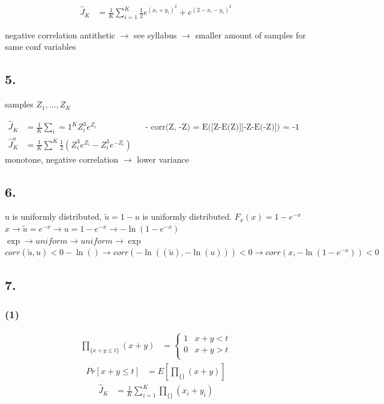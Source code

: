 \begin{align*}
\widehat{J}_{K}&=\frac{1}{K}\sum _{{i=1}}^{K}\frac{1}{2}e^{\left(x_{i}+y_{i}\right)^{2}}+e^{\left(2-x_{i}-y_{i}\right)^{2}}
\end{align*}

negative correlation antithetic $\rightarrow $ see syllabus $\rightarrow $ smaller amount of samples for same conf variables

\subsection*{ 5. }

samples $Z_{1},\ldots ,Z_{K}$

\begin{align*}
\widehat{J}_{K}&=\frac{1}{K}\sum _{i}=1^{K}Z_{i}^{3}e^{{Z_{i}}}&& \text{-  corr(Z, -Z) = E([Z-E(Z)][-Z-E(-Z)]) = -1 -}\\
\widehat{J}_{K}^{a}&=\frac{1}{K}\sum ^{K}\frac{1}{2}\left(Z^{3}_{i}e^{{Z_{i}}}-Z_{i}^{3}e^{{-Z_{i}}}\right)
\end{align*}
monotone, negative correlation $\rightarrow $ lower variance

\subsection*{ 6. }

u is uniformly distributed, $\widetilde{u} = 1-u$ is uniformly distributed. $F_{x}\left(x\right)=1-e^{{-x}}$\\
$x\rightarrow \widetilde{u}=e^{-x}\rightarrow u=1-e^{-x}\rightarrow -\ln \left(1-e^{-x}\right)$\\
$\exp \rightarrow uniform\rightarrow uniform\rightarrow \exp $\\
$corr\left(\widetilde{u},u\right)< 0-\ln \left(\right)\rightarrow corr\left(-\ln \left(\left(\widetilde{u}\right),-\ln \left(u\right)\right)\right)< 0\rightarrow corr\left(x,-\ln \left(1-e^{-x}\right)\right)< 0$

\subsection*{ 7. }

\subsubsection*{ (1) }

\begin{align*}
\prod _{{\{x+y\le t\}}}\left(x+y\right)&=\begin{cases}
1&x+y< t\\
0&x+y> t\\
\end{cases}
\end{align*}
\begin{align*}
Pr\left[x+y\le t\right]&=E\left[\prod _{{\{\}}}\left(x+y\right)\right]
\end{align*}
\begin{align*}
\widehat{J}_{K}&=\frac{1}{K}\sum _{{i=1}}^{K}\prod _{{\{\}}}\left(x_{i}+y_{i}\right)
\end{align*}

